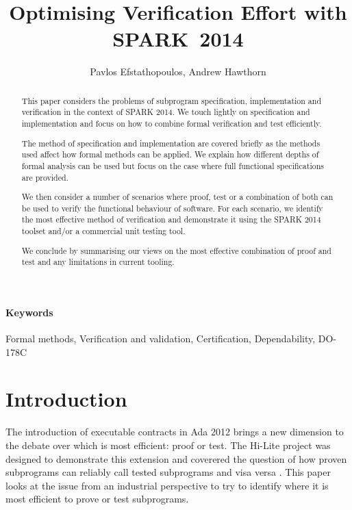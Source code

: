 \documentclass{llncs}
\newcommand{\newspark}{SPARK~2014\xspace}
\begin{document}
\title{Optimising Verification Effort with \newspark}

\author{Pavlos Efstathopoulos, Andrew Hawthorn}

\maketitle

\begin{abstract}
  This paper considers the problems of subprogram specification,
  implementation and verification in the context of SPARK 2014. We
  touch lightly on specification and implementation and focus on how
  to combine formal verification and test efficiently.

  The method of specification and implementation are covered briefly
  as the methods used affect how formal methods can be applied. We
  explain how different depths of formal analysis can be used but
  focus on the case where full functional specifications are provided.

  We then consider a number of scenarios where proof, test or a
  combination of both can be used to verify the functional behaviour
  of software. For each scenario, we identify the most effective
  method of verification and demonstrate it using the SPARK 2014
  toolset and/or a commercial unit testing tool.

  We conclude by summarising our views on the most effective
  combination of proof and test and any limitations in current
  tooling.
\end{abstract}

\paragraph{Keywords}
Formal methods, Verification and validation, Certification,
Dependability, DO-178C

\section{Introduction}
The introduction of executable contracts in Ada 2012 brings a new
dimension to the debate over which is most efficient: proof or
test. The Hi-Lite project was designed to demonstrate this extension
and coverered the question of how proven subprograms can reliably call
tested subprograms and visa versa \cite{hiliteERTS2012}. This paper
looks at the issue from an industrial perspective to try to identify
where it is most efficient to prove or test subprograms.
\end{document}
